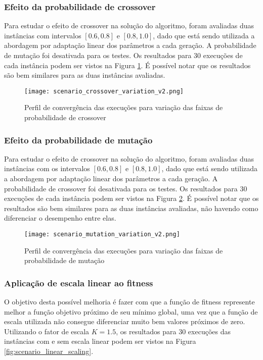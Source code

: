 \documentclass[conference]{IEEEtran}
\begin{document}
\subsubsection{Efeito da probabilidade de crossover}

Para estudar o efeito de crossover na solução do algoritmo, foram avaliadas duas instâncias com intervalos $[0.6,0.8]$ e $[0.8, 1.0]$, dado que está sendo utilizada a abordagem por adaptação linear dos parâmetros a cada geração. A probabilidade de mutação foi desativada para os testes. Os resultados para 30 execuções de cada instância podem ser vistos na Figura \ref{fig:scenario_crossover_variation}. É possível notar que os resultados são bem similares para as duas instâncias avaliadas.

\begin{figure}[h!]
	\centering
	\texttt{[image: scenario\_crossover\_variation\_v2.png]}
	\caption{Perfil de convergência das execuções para variação das faixas de probabilidade de crossover}
	\label{fig:scenario_crossover_variation}
\end{figure}

\subsubsection{Efeito da probabilidade de mutação}

Para estudar o efeito de crossover na solução do algoritmo, foram avaliadas duas instâncias com os intervalos $[0.6,0.8]$ e $[0.8, 1.0]$, dado que está sendo utilizada a abordagem por adaptação linear dos parâmetros a cada geração. A probabilidade de crossover foi desativada para os testes. Os resultados para 30 execuções de cada instância podem ser vistos na Figura \ref{fig:scenario_mutation_variation}. É possível notar que os resultados são bem similares para as duas instâncias avaliadas, não havendo como diferenciar o desempenho entre elas.

\begin{figure}[h!]
	\centering
	\texttt{[image: scenario\_mutation\_variation\_v2.png]}
	\caption{Perfil de convergência das execuções para variação das faixas de probabilidade de mutação}
	\label{fig:scenario_mutation_variation}
\end{figure}

\subsubsection{Aplicação de escala linear ao fitness}
O objetivo desta possível melhoria é fazer com que a função de fitness represente melhor a função objetivo próximo de seu mínimo global, uma vez que a função de escala utilizada não consegue diferenciar muito bem valores próximos de zero. Utilizando o fator de escala $K = 1.5$, os resultados para 30 execuções das instâncias com e sem escala linear podem ser vistos na Figura \ref{fig:scenario_linear_scaling}.
\end{document}
